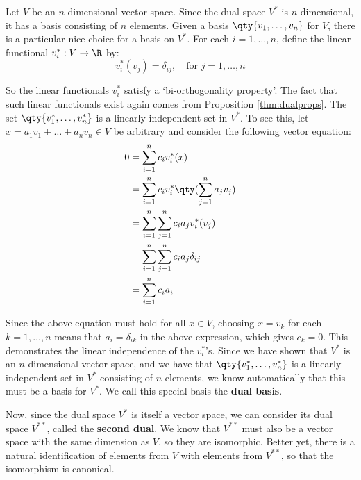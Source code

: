 Let \( V \) be an \( n \)-dimensional vector space. Since the dual space \( V^* \) is \( n \)-dimensional, it has a basis consisting of \( n \) elements. Given a basis \( \qty{v_1,\dots,v_n} \) for \( V \), there is a particular nice choice for a basis on \( V^* \). For each \( i=1,\dots,n \), define the linear functional \( v^*_i:V\to\R \) by:
\[ v^*_i(v_j)=\delta_{ij}, \quad\text{for }j=1,\dots,n \]

So the linear functionals \( v^*_i \) satisfy a `bi-orthogonality property'. The fact that such linear functionals exist again comes from Proposition \ref{thm:dualprops}. The set \( \qty{v^*_1,\dots,v^*_n} \) is a linearly independent set in \( V^* \). To see this, let \( x=a_1v_1+\dots+a_nv_n\in V \) be arbitrary and consider the following vector equation:
\begin{align*}
  0&= \sum_{i=1}^nc_iv^*_i(x)\\
  &= \sum_{i=1}^nc_iv^*_i\qty(\sum_{j=1}^na_jv_j)\\
  &= \sum_{i=1}^n\sum_{j=1}^nc_ia_jv^*_i(v_j)\\
  &= \sum_{i=1}^n\sum_{j=1}^nc_ia_j\delta_{ij}\\
  &= \sum_{i=1}^n c_ia_i
\end{align*}

Since the above equation must hold for all \( x\in V \), choosing \( x=v_k \) for each \( k=1,\dots,n \) means that \( a_i=\delta_{ik} \) in the above expression, which gives \( c_k=0 \). This demonstrates the linear independence of the \( v^*_i \)'s. Since we have shown that \( V^* \) is an \( n \)-dimensional vector space, and we have that \( \qty{v^*_1,\dots,v^*_n} \) is a linearly independent set in \( V^* \) consisting of \( n \) elements, we know automatically that this must be a basis for \( V^* \). We call this special basis the \textbf{dual basis}.

\vspace{3mm}

Now, since the dual space \( V^* \) is itself a vector space, we can consider its dual space \( V^{**} \), called the \textbf{second dual}. We know that \( V^{**} \) must also be a vector space with the same dimension as \( V \), so they are isomorphic. Better yet, there is a natural identification of elements from \( V \) with elements from \( V^{**} \), so that the isomorphism is canonical.

